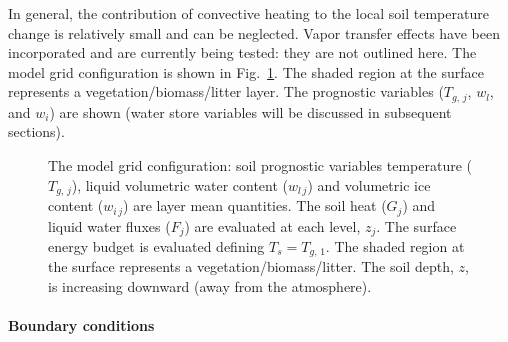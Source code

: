 In general, the contribution of convective heating to the local
soil temperature change is relatively small and can be neglected.
Vapor transfer effects have been incorporated and are currently
being tested: they are not outlined here.
The model grid configuration is shown in Fig.~\ref{grid}.
The shaded region at the surface represents a vegetation/biomass/litter
layer. The prognostic variables ($T_{g,\,j}$, $w_l$, and $w_i$) 
are shown (water store variables
will be discussed in subsequent sections).

\begin{figure}[h]
		 \begin{center}
		 \caption{The model grid configuration: soil prognostic variables
temperature ($T_{g,\,j}$), liquid volumetric water content
($w_{l\,j}$) and volumetric ice content ($w_{i\,j}$) 
are layer mean quantities. The soil heat ($G_j$) and liquid
water fluxes ($F_j$) are evaluated at each level, $z_j$.
The surface energy budget is evaluated defining $T_s = T_{g,\,1}$.
The shaded region at the surface represents a vegetation/biomass/litter.
The soil depth, $z$, is increasing downward (away from the atmosphere).}
		 \label{grid}
		 \end{center}
\end{figure}


\paragraph{Boundary conditions}


